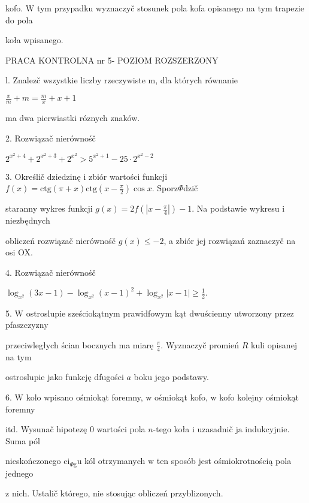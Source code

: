 \documentclass[a4paper,12pt]{article}
\begin{document}
kofo. $\mathrm{W}$ tym przypadku wyznaczyč stosunek pola kofa opisanego na tym trapezie do pola

koła wpisanego.





PRACA KONTROLNA nr 5- POZIOM ROZSZERZONY

l. Znalez$\acute{}$č wszystkie liczby rzeczywiste m, dla których równanie

$\displaystyle \frac{x}{m}+m=\frac{m}{x}+x+1$

ma dwa pierwiastki róznych znaków.

2. Rozwiązač nierównośč

$2^{x^{2}+4}+2^{x^{2}+3}+2^{x^{2}}>5^{x^{2}+1}-25\cdot 2^{x^{2}-2}$

3. Określič dziedzinę $\mathrm{i}$ zbiór wartości funkcji $f(x)=\displaystyle \mathrm{c}\mathrm{t}\mathrm{g}(\pi+x)\mathrm{c}\mathrm{t}\mathrm{g}(x-\frac{\pi}{2})\cos x$. Sporz$\Phi$dzič

staranny wykres funkcji $g(x) =2f(|x-\displaystyle \frac{\pi}{4}|)-1$. Na podstawie wykresu $\mathrm{i}$ niezbędnych

obliczeń rozwiązač nierównośč $g(x)\leq-2$, a zbiór jej rozwiązań zaznaczyč na osi OX.

4. Rozwiązač nierównośč

$\displaystyle \log_{x^{2}}(3x-1)-\log_{x^{2}}(x-1)^{2}+\log_{x^{2}}|x-1|\geq\frac{1}{2}.$

5. $\mathrm{W}$ ostroslupie sześciokątnym prawidfowym kąt dwuścienny utworzony przez pfaszczyzny

przeciwległych ścian bocznych ma miarę $\displaystyle \frac{\pi}{4}$. Wyznaczyč promień $R$ kuli opisanej na tym

ostroslupie jako funkcję dfugości $a$ boku jego podstawy.

6. $\mathrm{W}$ kolo wpisano ośmiokąt foremny, $\mathrm{w}$ ośmiokąt kofo, $\mathrm{w}$ kofo kolejny ośmiokąt foremny

itd. Wysunač hipotezę $0$ wartości pola $n$-tego koła $\mathrm{i}$ uzasadnič $\mathrm{j}\mathrm{a}$ indukcyjnie. Suma pól

nieskończonego $\mathrm{c}\mathrm{i}_{\Phi \mathrm{g}}\mathrm{u}$ kól otrzymanych $\mathrm{w}$ ten sposób jest ośmiokrotnością pola jednego

$\mathrm{z}$ nich. Ustalič którego, nie stosując obliczeń przyblizonych.
\end{document}
